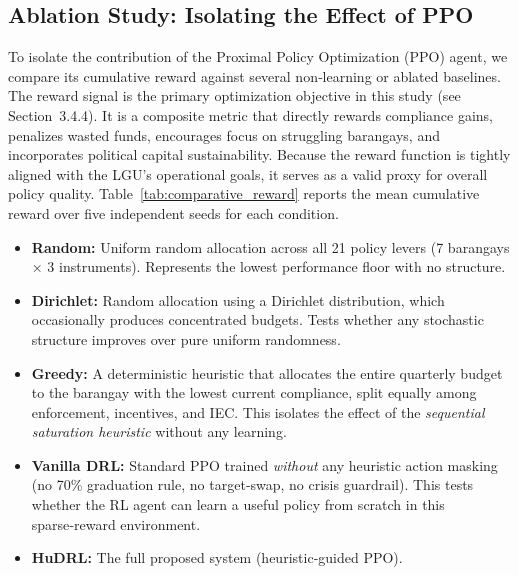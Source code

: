 \subsection{Ablation Study: Isolating the Effect of PPO}
\label{subsec:ablation}

To isolate the contribution of the Proximal Policy Optimization (PPO) agent, we compare its cumulative reward against several non‑learning or ablated baselines. The reward signal is the primary optimization objective in this study (see Section~3.4.4). It is a composite metric that directly rewards compliance gains, penalizes wasted funds, encourages focus on struggling barangays, and incorporates political capital sustainability. Because the reward function is tightly aligned with the LGU’s operational goals, it serves as a valid proxy for overall policy quality. Table~\ref{tab:comparative_reward} reports the mean cumulative reward over five independent seeds for each condition.

\begin{itemize}
    \item \textbf{Random:} Uniform random allocation across all 21 policy levers (7 barangays × 3 instruments). Represents the lowest performance floor with no structure.
    \item \textbf{Dirichlet:} Random allocation using a Dirichlet distribution, which occasionally produces concentrated budgets. Tests whether any stochastic structure improves over pure uniform randomness.
    \item \textbf{Greedy:} A deterministic heuristic that allocates the entire quarterly budget to the barangay with the lowest current compliance, split equally among enforcement, incentives, and IEC. This isolates the effect of the \textit{sequential saturation heuristic} without any learning.
    \item \textbf{Vanilla DRL:} Standard PPO trained \textit{without} any heuristic action masking (no 70\% graduation rule, no target‑swap, no crisis guardrail). This tests whether the RL agent can learn a useful policy from scratch in this sparse‑reward environment.
    \item \textbf{HuDRL:} The full proposed system (heuristic‑guided PPO).
\end{itemize}

